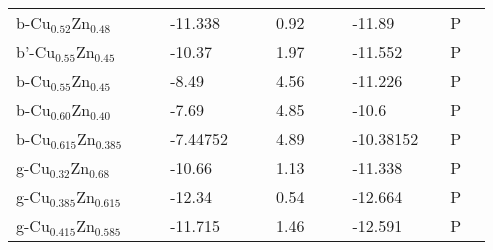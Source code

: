 \begin{landscape}
\begin{center}
\begin{longtable}{|l|p{2.5cm}|l|p{2.5cm}|l|l|p{2.5cm}|l|l|p{2.5cm}|l|l|l|}
b-Cu$_{0.52}$Zn$_{0.48 }$    &                            &                   & -11.338             &     & \citep{KubaschewskiCatterallJohnAshley.1956} & 0.92               &     & \citep{KubaschewskiCatterallJohnAshley.1956} & -11.89                              &     & P                 \\
b'-Cu$_{0.55}$Zn$_{0.45}$    &                            &                   & -10.37              &     & \citep{KubaschewskiCatterallJohnAshley.1956} & 1.97               &     & \citep{KubaschewskiCatterallJohnAshley.1956} & -11.552                             &     & P                 \\
b-Cu$_{0.55}$Zn$_{0.45 }$    &                            &                   & -8.49               &     & \citep{KubaschewskiCatterallJohnAshley.1956} & 4.56               &     & \citep{KubaschewskiCatterallJohnAshley.1956} & -11.226                             &     & P                 \\
b-Cu$_{0.60}$Zn$_{0.40}$     &                            &                   & -7.69               &     & \citep{KubaschewskiCatterallJohnAshley.1956} & 4.85               &     & \citep{KubaschewskiCatterallJohnAshley.1956} & -10.6                               &     & P                 \\
b-Cu$_{0.615}$Zn$_{0.385 }$  &                            &                   & -7.44752            &     & \citep{KubaschewskiCatterallJohnAshley.1956} & 4.89               &     & \citep{KubaschewskiCatterallJohnAshley.1956} & -10.38152                           &     & P                 \\
g-Cu$_{0.32}$Zn$_{0.68}$     &                            &                   & -10.66              &     & \citep{KubaschewskiCatterallJohnAshley.1956} & 1.13               &     & \citep{KubaschewskiCatterallJohnAshley.1956} & -11.338                             &     & P                 \\
g-Cu$_{0.385}$Zn$_{0.615}$   &                            &                   & -12.34              &     & \citep{KubaschewskiCatterallJohnAshley.1956} & 0.54               &     & \citep{KubaschewskiCatterallJohnAshley.1956} & -12.664                             &     & P                 \\
g-Cu$_{0.415}$Zn$_{0.585 }$  &                            &                   & -11.715             &     & \citep{KubaschewskiCatterallJohnAshley.1956} & 1.46               &     & \citep{KubaschewskiCatterallJohnAshley.1956} & -12.591                             &     & P                 \\

\end{longtable}
\end{center}
\end{landscape}
